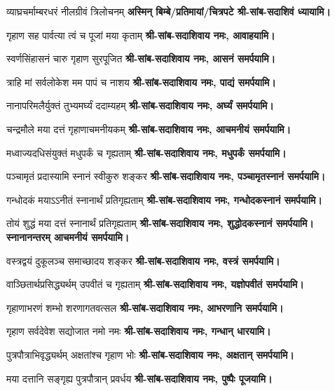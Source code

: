 \renewcommand{\devAya}{श्री-सांब-सदाशिवाय नमः,}
\begin{center}

{व्याघ्रचर्माम्बरधरं नीलग्रीवं त्रिलोचनम्}
\textbf{अस्मिन् बिम्बे/प्रतिमायां/चित्रपटे श्री-सांब-सदाशिवं ध्यायामि।}
\medskip

{गृहाण सह पार्वत्या त्वं च पूजां मया कृताम्}
\textbf{\devAya{} आवाहयामि।}
\medskip

{स्वर्णसिंहासनं चारु गृहाण सुरपूजित}
\textbf{\devAya{} आसनं समर्पयामि।}
\medskip

{त्राहि मां सर्वलोकेश मम पापं च नाशय}
\textbf{\devAya{} पाद्यं समर्पयामि।}
\medskip

{नानापरिमलैर्युक्तं तुभ्यमर्घ्यं ददाम्यहम्}
\textbf{\devAya{} अर्घ्यं समर्पयामि।}
\medskip

{चन्द्रमौले मया दत्तं गृहाणाचमनीयकम्}
\textbf{\devAya{} आचमनीयं समर्पयामि।}
\medskip

{मध्वाज्यदधिसंयुक्तं मधुपर्कं च गृह्यताम्}
\textbf{\devAya{} मधुपर्कं समर्पयामि।}
\medskip

{पञ्चामृतं प्रदास्यामि स्नानं स्वीकुरु शङ्कर}
\textbf{\devAya{} पञ्चामृतस्नानं समर्पयामि।}
\medskip

{गन्धोदकं मयाऽऽनीतं स्नानार्थं प्रतिगृह्यताम्}
\textbf{\devAya{} गन्धोदकस्नानं समर्पयामि।}
\medskip

{तोयं शुद्धं मया दत्तं स्नानार्थं प्रतिगृह्यताम्}
\textbf{\devAya{} शुद्धोदकस्नानं समर्पयामि। स्नानानन्तरम् आचमनीयं समर्पयामि।}
\medskip

{वस्त्रद्वयं दुकूलञ्च समाच्छादय शङ्कर}
\textbf{\devAya{} वस्त्रं समर्पयामि।}
\medskip

{वाञ्छितार्थप्रसिद्ध्यर्थम् उपवीतं च गृह्यताम्}
\textbf{\devAya{} यज्ञोपवीतं समर्पयामि।}
\medskip

{गृहाणाभरणं शम्भो शरणागतवत्सल}
\textbf{\devAya{} आभरणानि समर्पयामि।}
\medskip

{गृहाण सर्वदेवेश सद्योजात नमो नमः}
\textbf{\devAya{} गन्धान् धारयामि।}
\medskip

{पुत्रपौत्राभिवृद्ध्यर्थम् अक्षतांश्च गृहाण भोः}
\textbf{\devAya{} अक्षतान् समर्पयामि।}
\medskip

{मया दत्तानि सङ्गृह्य पुत्रपौत्रान् प्रवर्धय}
\textbf{\devAya{} पुष्पैः पूजयामि।}

\end{center}

